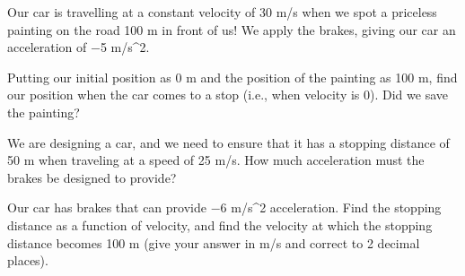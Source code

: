 \documentclass{letter}
\begin{document}
  \begin{problem}{}
    Our car is travelling at a constant velocity of 30 m/s when we spot
    a priceless painting on the road 100 m in front of us! We apply the
    brakes, giving our car an acceleration of $-$5 m/s^2.

    Putting our initial position as 0 m and the position of the painting
    as 100 m, find our position when the car comes to a stop (i.e., when
    velocity is 0). Did we save the painting?
  \end{problem}

  \begin{problem}{}
    We are designing a car, and we need to ensure that it has a stopping
    distance of 50 m when traveling at a speed of 25 m/s. How much
    acceleration must the brakes be designed to provide?
  \end{problem}

  \begin{problem}{}
    Our car has brakes that can provide $-$6 m/s^2 acceleration. Find
    the stopping distance as a function of velocity, and find the
    velocity at which the stopping distance becomes 100 m (give your
    answer in m/s and correct to 2 decimal places).
  \end{problem}
\end{document}
